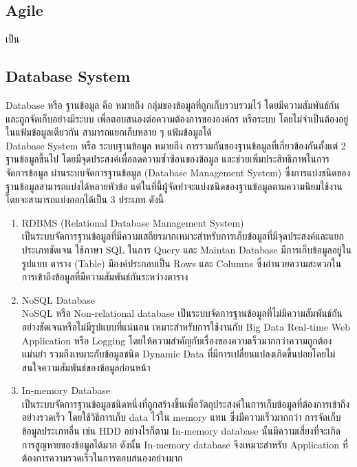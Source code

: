 \documentclass[12pt,oneside,openright,a4paper]{cpe-thai-project}
\begin{document}
\subsection{Agile}
\hspace*{1cm} เป็น


\subsection{Database System}
\hspace*{1cm} Database หรือ ฐานข้อมูล คือ หมายถึง กลุ่มของข้อมูลที่ถูกเก็บรวบรวมไว้ โดยมีความสัมพันธ์กัน และถูกจัดเก็บอย่างมีระบบ เพื่อตอบสนองต่อความต้องการขององค์กร หรือระบบ โดยไม่จำเป็นต้องอยู่ในแฟ้มข้อมูลเดียวกัน สามารถแยกเก็บหลาย ๆ แฟ้มข้อมูลได้\\
\hspace*{1cm} Database System หรือ ระบบฐานข้อมูล หมายถึง การรวมกันของฐานข้อมูลที่เกี่ยวข้องกันตั้งแต่ 2 ฐานข้อมูลขึ้นไป โดยมีจุดประสงค์เพื่อลดความซ้ำซ้อนของข้อมูล และช่วยเพิ่มประสิทธิภาพในการจัดการข้อมูล ผ่านระบบจัดการฐานข้อมูล (Database Management System) ซึ่งการแบ่งชนิดของฐานข้อมูลสามารถแบ่งได้หลายหัวข้อ แต่ในที่นี้ผู้จัดทำจะแบ่งชนิดของฐานข้อมูลตามความนิยมใช้งาน โดยจะสามารถแบ่งออกได้เป็น 3 ประเภท ดังนี้
\begin{enumerate}
    \item {RDBMS (Relational Database Management System)}\\
    \hspace*{1cm}เป็นระบบจัดการฐานข้อมูลที่มีความเสถียรมากเหมาะสำหรับการเก็บข้อมูลที่มีจุดประสงค์และแยกประเภทชัดเจน ใช้ภาษา SQL ในการ Query และ Maintan Database มีการเก็บข้อมูลอยู่ในรูปแบบ ตาราง (Table) มีองค์ประกอบเป็น Rows และ Columns ซึ่งอำนวยความสะดวกในการเข้าถึงข้อมูลที่มีความสัมพันธ์กันระหว่างตาราง
    \item {NoSQL Database}\\
    \hspace*{1cm}NoSQL หรือ Non-relational database เป็นระบบจัดการฐานข้อมูลที่ไม่มีความสัมพันธ์กันอย่างชัดเจนหรือไม่มีรูปแบบที่แน่นอน เหมาะสำหรับการใช้งานกับ Big Data Real-time Web Application หรือ Logging โดยให้ความสำคัญกับเรื่องของความเร็วมากกว่าความถูกต้องแม่นยำ รวมถึงเหมาะกับข้อมูลชนิด Dynamic Data ที่มีการเปลี่ยนแปลงเกิดขึ้นบ่อยโดยไม่สนใจความสัมพันธ์ของข้อมูลก่อนหน้า
    \item {In-memory Database}\\
    \hspace*{1cm}เป็นระบบจัดการฐานข้อมูลชนิดหนึ่งที่ถูกสร้างขึ้นเพื่อวัตถุประสงค์ในการเก็บข้อมูลที่ต้องการเข้าถึงอย่างรวดเร็ว โดยใช้วิธีการเก็บ data ไว้ใน memory แทน ซึ่งมีความเร็วมากกว่า การจัดเก็บข้อมูลประเภทอื่น เช่น HDD อย่างไรก็ตาม In-memory database นั้นมีความเสี่ยงที่จะเกิดการสูญหายของข้อมูลได้มาก ดังนั้น In-memory database จึงเหมาะสำหรับ Application ที่ต้องการความรวดเร็วในการตอบสนองอย่างมาก
\end{enumerate}
\end{document}
